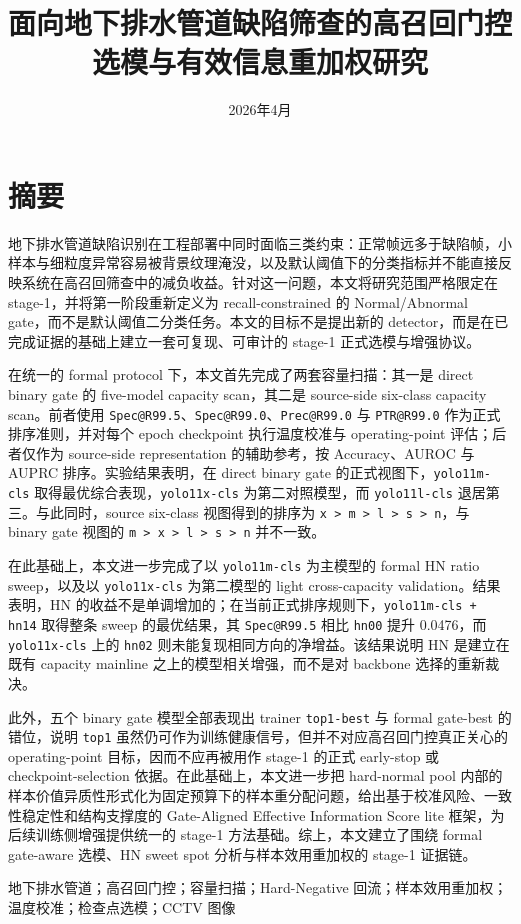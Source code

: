 \documentclass[UTF8,openany,12pt]{ctexbook}
\title{面向地下排水管道缺陷筛查的高召回门控选模与有效信息重加权研究}
\author{}
\date{2026年4月}
\newcommand{\keywords}[1]{\par\noindent{\heiti 关键词：}#1}
\newcommand{\formalmetric}[1]{\texttt{#1}}
\begin{document}
\songti

\frontmatter

\chapter*{摘要}
地下排水管道缺陷识别在工程部署中同时面临三类约束：正常帧远多于缺陷帧，小样本与细粒度异常容易被背景纹理淹没，以及默认阈值下的分类指标并不能直接反映系统在高召回筛查中的减负收益。针对这一问题，本文将研究范围严格限定在 stage-1，并将第一阶段重新定义为 recall-constrained 的 Normal/Abnormal gate，而不是默认阈值二分类任务。本文的目标不是提出新的 detector，而是在已完成证据的基础上建立一套可复现、可审计的 stage-1 正式选模与增强协议。

在统一的 formal protocol 下，本文首先完成了两套容量扫描：其一是 direct binary gate 的 five-model capacity scan，其二是 source-side six-class capacity scan。前者使用 \formalmetric{Spec@R99.5}、\formalmetric{Spec@R99.0}、\formalmetric{Prec@R99.0} 与 \formalmetric{PTR@R99.0} 作为正式排序准则，并对每个 epoch checkpoint 执行温度校准与 operating-point 评估；后者仅作为 source-side representation 的辅助参考，按 Accuracy、AUROC 与 AUPRC 排序。实验结果表明，在 direct binary gate 的正式视图下，\texttt{yolo11m-cls} 取得最优综合表现，\texttt{yolo11x-cls} 为第二对照模型，而 \texttt{yolo11l-cls} 退居第三。与此同时，source six-class 视图得到的排序为 \texttt{x > m > l > s > n}，与 binary gate 视图的 \texttt{m > x > l > s > n} 并不一致。

在此基础上，本文进一步完成了以 \texttt{yolo11m-cls} 为主模型的 formal HN ratio sweep，以及以 \texttt{yolo11x-cls} 为第二模型的 light cross-capacity validation。结果表明，HN 的收益不是单调增加的；在当前正式排序规则下，\texttt{yolo11m-cls + hn14} 取得整条 sweep 的最优结果，其 \formalmetric{Spec@R99.5} 相比 \texttt{hn00} 提升 0.0476，而 \texttt{yolo11x-cls} 上的 \texttt{hn02} 则未能复现相同方向的净增益。该结果说明 HN 是建立在既有 capacity mainline 之上的模型相关增强，而不是对 backbone 选择的重新裁决。

此外，五个 binary gate 模型全部表现出 trainer \formalmetric{top1-best} 与 formal gate-best 的错位，说明 \formalmetric{top1} 虽然仍可作为训练健康信号，但并不对应高召回门控真正关心的 operating-point 目标，因而不应再被用作 stage-1 的正式 early-stop 或 checkpoint-selection 依据。在此基础上，本文进一步把 hard-normal pool 内部的样本价值异质性形式化为固定预算下的样本重分配问题，给出基于校准风险、一致性稳定性和结构支撑度的 Gate-Aligned Effective Information Score lite 框架，为后续训练侧增强提供统一的 stage-1 方法基础。综上，本文建立了围绕 formal gate-aware 选模、HN sweet spot 分析与样本效用重加权的 stage-1 证据链。
\keywords{地下排水管道；高召回门控；容量扫描；Hard-Negative 回流；样本效用重加权；温度校准；检查点选模；CCTV 图像}
\end{document}
